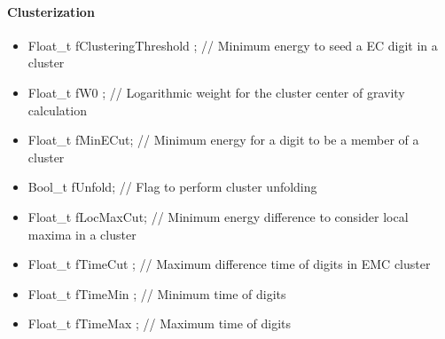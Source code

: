 \paragraph*{Clusterization }
\begin{itemize}

   \item  Float\_t fClusteringThreshold ; // Minimum energy to seed a EC digit in a cluster

   \item  Float\_t fW0 ;                       // Logarithmic weight for the cluster center of gravity calculation

   \item  Float\_t fMinECut;                  // Minimum energy for a digit to be a member of a cluster

   \item  Bool\_t  fUnfold;                   // Flag to perform cluster unfolding

   \item  Float\_t fLocMaxCut;              // Minimum energy difference to consider local maxima in a cluster

   \item  Float\_t fTimeCut ;                // Maximum difference time of digits in EMC cluster

   \item  Float\_t fTimeMin ;                // Minimum time of digits

   \item  Float\_t fTimeMax ;               // Maximum time of digits
\end{itemize}

